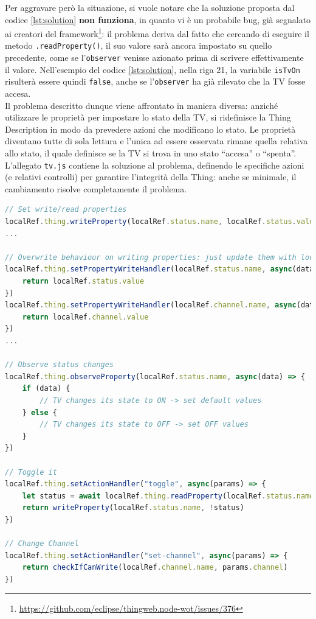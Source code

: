 \documentclass[12pt,a4paper,openright,oneside]{report}
\newcommand{\quotes}[1]{``#1''}
\begin{document}
Per aggravare però la situazione, si vuole notare che la soluzione proposta dal codice \ref{lst:solution} \textbf{non funziona}, in quanto vi è un probabile bug, già segnalato ai creatori del framework\footnote{\url{https://github.com/eclipse/thingweb.node-wot/issues/376}}: il problema deriva dal fatto che cercando di eseguire il metodo \texttt{.readProperty()}, il suo valore sarà ancora impostato su quello precedente, come se l'\texttt{observer} venisse azionato prima di scrivere effettivamente il valore. Nell'esempio del codice \ref{lst:solution}, nella riga 21, la variabile \texttt{isTvOn} risulterà essere quindi \texttt{false}, anche se l'\texttt{observer} ha già rilevato che la TV fosse accesa.\\

Il problema descritto dunque viene affrontato in maniera diversa: anziché utilizzare le proprietà per impostare lo stato della TV, si ridefinisce la Thing Description in modo da prevedere azioni che modificano lo stato. Le proprietà diventano tutte di sola lettura e l'unica ad essere osservata rimane quella relativa allo stato, il quale definisce se la TV si trova in uno stato \quotes{accesa} o \quotes{spenta}. L'allegato \texttt{tv.js} contiene la soluzione  al problema, definendo le specifiche azioni (e relativi controlli) per garantire l'integrità della Thing: anche se minimale, il cambiamento risolve completamente il problema.\\


\begin{lstlisting}[language=JavaScript,caption={Solzuione definitiva per la dipendenza tra proprietà della Thing},label=lst:solution2]
// Set write/read properties
localRef.thing.writeProperty(localRef.status.name, localRef.status.value)
...

// Overwrite behaviour on writing properties: just update them with local data
localRef.thing.setPropertyWriteHandler(localRef.status.name, async(data) => {
	return localRef.status.value
})
localRef.thing.setPropertyWriteHandler(localRef.channel.name, async(data) => {
	return localRef.channel.value
})
...

// Observe status changes
localRef.thing.observeProperty(localRef.status.name, async(data) => {
	if (data) {
		// TV changes its state to ON -> set default values
	} else {
		// TV changes its state to OFF -> set OFF values
	}
})

// Toggle it
localRef.thing.setActionHandler("toggle", async(params) => {
	let status = await localRef.thing.readProperty(localRef.status.name)
	return writeProperty(localRef.status.name, !status)
})

// Change Channel
localRef.thing.setActionHandler("set-channel", async(params) => {
	return checkIfCanWrite(localRef.channel.name, params.channel)
})
\end{lstlisting}
\end{document}

